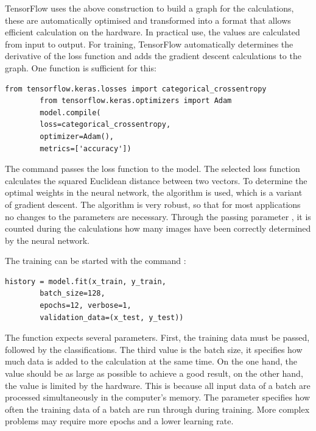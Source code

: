 TensorFlow uses the above construction to build a graph for the calculations, these are automatically optimised and transformed into a format that allows efficient calculation on the hardware. In practical use, the values are calculated from input to output. For training, TensorFlow automatically determines the derivative of the loss function and adds the gradient descent calculations to the graph. One function is sufficient for this:

\begin{code}
    \begin{lstlisting}[numbers=none]
        from tensorflow.keras.losses import categorical_crossentropy
        from tensorflow.keras.optimizers import Adam
        model.compile(
        loss=categorical_crossentropy,
        optimizer=Adam(),
        metrics=['accuracy'])
    \end{lstlisting}
    
    \caption{Preparation of the training}
\end{code}


The command passes the loss function  to the model. The selected loss function calculates the squared Euclidean distance between two vectors. To determine the optimal weights in the neural network, the algorithm  is used, which is a variant of gradient descent. The algorithm is very robust, so that for most applications no changes to the parameters are necessary. Through the passing parameter , it is counted during the calculations how many images have been correctly determined by the neural network.


\bigskip

The training can be started with the command :

\begin{code}
    \begin{lstlisting}[numbers=none]
        history = model.fit(x_train, y_train,
        batch_size=128,
        epochs=12, verbose=1,
        validation_data=(x_test, y_test))
    \end{lstlisting}
    
    \caption{Implementation of the training}
\end{code}


The function expects several parameters. First, the training data must be passed, followed by the classifications. The third value is the batch size, it specifies how much data is added to the calculation at the same time. On the one hand, the value should be as large as possible to achieve a good result, on the other hand, the value is limited by the hardware. This is because all input data of a batch are processed simultaneously in the computer's memory. The parameter  specifies how often the training data of a batch are run through during training. More complex problems may require more epochs and a lower learning rate.

